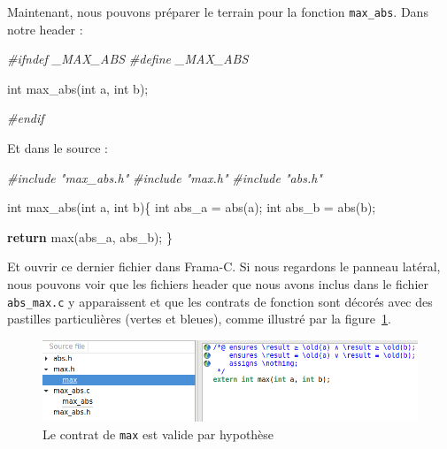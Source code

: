 \documentclass[12pt,francais,]{scrbook}
\newenvironment{Shaded}{}{}
\newcommand{\KeywordTok}[1]{\textcolor[rgb]{0.00,0.44,0.13}{\textbf{{#1}}}}
\newcommand{\DataTypeTok}[1]{\textcolor[rgb]{0.56,0.13,0.00}{{#1}}}
\newcommand{\CommentTok}[1]{\textcolor[rgb]{0.38,0.63,0.69}{\textit{{#1}}}}
\newcommand{\NormalTok}[1]{{#1}}
\begin{document}
Maintenant, nous pouvons préparer le terrain pour la fonction
\texttt{max\_abs}. Dans notre header :

\begin{footnotesize}\begin{Shaded}
\begin{Highlighting}[]
\CommentTok{#ifndef _MAX_ABS}
\CommentTok{#define _MAX_ABS}

\DataTypeTok{int} \NormalTok{max_abs(}\DataTypeTok{int} \NormalTok{a, }\DataTypeTok{int} \NormalTok{b);}

\CommentTok{#endif}
\end{Highlighting}
\end{Shaded}\end{footnotesize}

Et dans le source :

\begin{footnotesize}\begin{Shaded}
\begin{Highlighting}[]
\CommentTok{#include "max_abs.h"}
\CommentTok{#include "max.h"}
\CommentTok{#include "abs.h"}

\DataTypeTok{int} \NormalTok{max_abs(}\DataTypeTok{int} \NormalTok{a, }\DataTypeTok{int} \NormalTok{b)\{}
  \DataTypeTok{int} \NormalTok{abs_a = abs(a);}
  \DataTypeTok{int} \NormalTok{abs_b = abs(b);}

  \KeywordTok{return} \NormalTok{max(abs_a, abs_b);}
\NormalTok{\}}
\end{Highlighting}
\end{Shaded}\end{footnotesize}

Et ouvrir ce dernier fichier dans Frama-C. Si nous regardons le panneau
latéral, nous pouvons voir que les fichiers header que nous avons inclus
dans le fichier \texttt{abs\_max.c} y apparaissent et que les contrats
de fonction sont décorés avec des pastilles particulières (vertes et
bleues), comme illustré par la figure~\ref{fig:2-4-max_abs}.

\begin{figure}[htbp]
\centering
\includegraphics[scale=0.5]{2-4-max_abs.png}
\caption{Le contrat de \texttt{max} est valide par hypothèse}
\label{fig:2-4-max_abs}
\end{figure}
\end{document}
